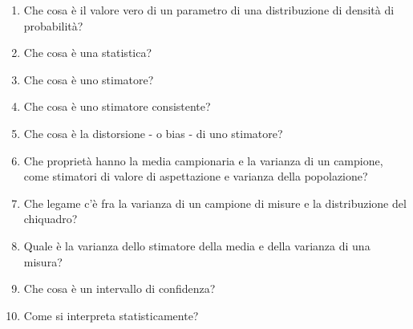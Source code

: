 \begin{enumerate}
	\item Che cosa \`{e} il valore vero di un parametro di una distribuzione di densit\`{a} di probabilit\`{a}?
	\item Che cosa \`{e} una statistica?
	\item Che cosa \`{e} uno stimatore?
	\item Che cosa \`{e} uno stimatore consistente?
	\item Che cosa \`{e} la distorsione - o bias - di uno stimatore?
	\item Che propriet\`{a} hanno la media campionaria e la varianza di un campione, come stimatori di valore di aspettazione e varianza della popolazione?
	\item Che legame c'\`{e} fra la varianza di un campione di misure e la distribuzione del chiquadro?
	\item Quale \`{e} la varianza dello stimatore della media e della varianza di una misura?
	\item Che cosa \`{e} un intervallo di confidenza?
	\item Come si interpreta statisticamente?

\end{enumerate}

